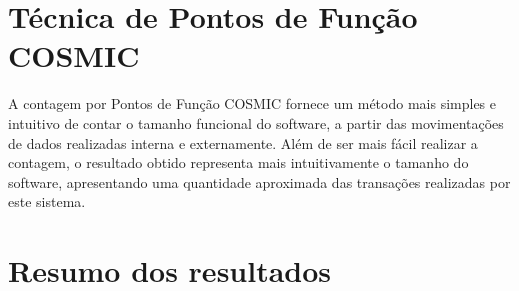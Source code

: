   \section{Técnica de Pontos de Função COSMIC}
  
    A contagem por Pontos de Função COSMIC fornece um método mais simples e intuitivo de contar o tamanho funcional do software, 
    a partir das movimentações de dados realizadas interna e externamente. Além de ser mais fácil realizar a contagem, o resultado obtido 
    representa mais intuitivamente o tamanho do software, apresentando uma quantidade aproximada das transações realizadas por este sistema.
    
    
    \section{Resumo dos resultados}
